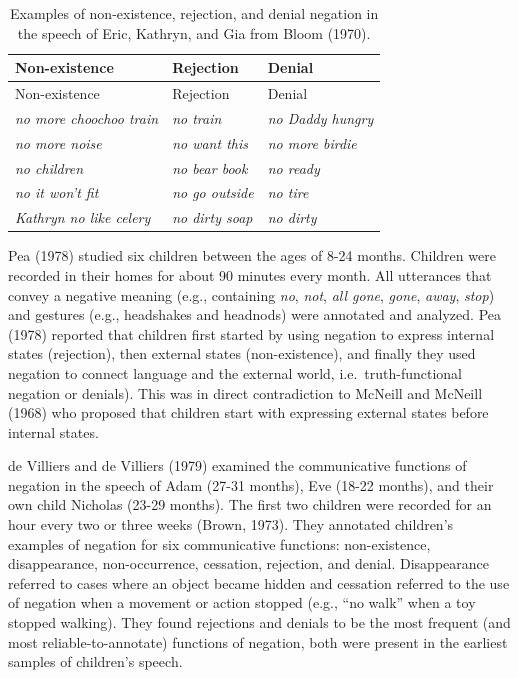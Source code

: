 \documentclass[
  english,
  man,floatsintext]{apa6}
\begin{document}
\begin{longtable}[]{@{}lll@{}}
\caption{\label{tab:bloom} Examples of non-existence, rejection, and denial negation in the speech of Eric, Kathryn, and Gia from Bloom (1970).}\tabularnewline
\toprule
Non-existence & Rejection & Denial \\
\midrule
\endfirsthead
\toprule
Non-existence & Rejection & Denial \\
\midrule
\endhead
\emph{no more choochoo train} & \emph{no train} & \emph{no Daddy hungry} \\
\emph{no more noise} & \emph{no want this} & \emph{no more birdie} \\
\emph{no children} & \emph{no bear book} & \emph{no ready} \\
\emph{no it won't fit} & \emph{no go outside} & \emph{no tire} \\
\emph{Kathryn no like celery} & \emph{no dirty soap} & \emph{no dirty} \\
\bottomrule
\end{longtable}

Pea (1978) studied six children between the ages of 8-24 months. Children were recorded in their homes for about 90 minutes every month. All utterances that convey a negative meaning (e.g., containing \emph{no}, \emph{not}, \emph{all gone}, \emph{gone}, \emph{away}, \emph{stop}) and gestures (e.g., headshakes and headnods) were annotated and analyzed. Pea (1978) reported that children first started by using negation to express internal states (rejection), then external states (non-existence), and finally they used negation to connect language and the external world, i.e.~truth-functional negation or denials). This was in direct contradiction to McNeill and McNeill (1968) who proposed that children start with expressing external states before internal states.

de Villiers and de Villiers (1979) examined the communicative functions of negation in the speech of Adam (27-31 months), Eve (18-22 months), and their own child Nicholas (23-29 months). The first two children were recorded for an hour every two or three weeks (Brown, 1973). They annotated children's examples of negation for six communicative functions: non-existence, disappearance, non-occurrence, cessation, rejection, and denial. Disappearance referred to cases where an object became hidden and cessation referred to the use of negation when a movement or action stopped (e.g., ``no walk'' when a toy stopped walking). They found rejections and denials to be the most frequent (and most reliable-to-annotate) functions of negation, both were present in the earliest samples of children's speech.
\end{document}
